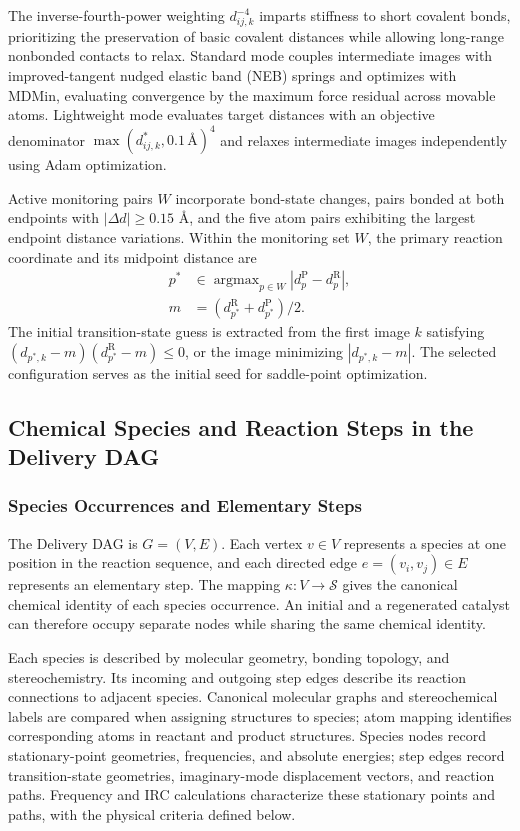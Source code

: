 The inverse-fourth-power weighting $d_{ij,k}^{-4}$ imparts stiffness to short covalent bonds, prioritizing the preservation of basic covalent distances while allowing long-range nonbonded contacts to relax. Standard mode couples intermediate images with improved-tangent nudged elastic band (NEB) springs and optimizes with MDMin, evaluating convergence by the maximum force residual across movable atoms.\citep{neb2000,ase2017} Lightweight mode evaluates target distances with an objective denominator $\max(d_{ij,k}^*,0.1\,\text{Å})^4$ and relaxes intermediate images independently using Adam optimization.\citep{adam2015}

Active monitoring pairs $W$ incorporate bond-state changes, pairs bonded at both endpoints with $|\Delta d|\ge 0.15$ Å, and the five atom pairs exhibiting the largest endpoint distance variations. Within the monitoring set $W$, the primary reaction coordinate and its midpoint distance are
\[
\begin{aligned}
p^*&\in\operatorname{argmax}_{p\in W}|d_p^{\mathrm{P}}-d_p^{\mathrm{R}}|,\\
m&=(d_{p^*}^{\mathrm{R}}+d_{p^*}^{\mathrm{P}})/2.
\end{aligned}
\]
The initial transition-state guess is extracted from the first image $k$ satisfying $(d_{p^*,k}-m)(d_{p^*}^{\mathrm{R}}-m)\le 0$, or the image minimizing $|d_{p^*,k}-m|$. The selected configuration serves as the initial seed for saddle-point optimization.

\subsection{Chemical Species and Reaction Steps in the Delivery DAG}

\subsubsection{Species Occurrences and Elementary Steps}
The Delivery DAG is $G=(V,E)$. Each vertex $v\in V$ represents a species at one position in the reaction sequence, and each directed edge $e=(v_i,v_j)\in E$ represents an elementary step. The mapping $\kappa:V\to\mathcal{S}$ gives the canonical chemical identity of each species occurrence. An initial and a regenerated catalyst can therefore occupy separate nodes while sharing the same chemical identity.

Each species is described by molecular geometry, bonding topology, and stereochemistry. Its incoming and outgoing step edges describe its reaction connections to adjacent species. Canonical molecular graphs and stereochemical labels are compared when assigning structures to species; atom mapping identifies corresponding atoms in reactant and product structures. Species nodes record stationary-point geometries, frequencies, and absolute energies; step edges record transition-state geometries, imaginary-mode displacement vectors, and reaction paths. Frequency and IRC calculations characterize these stationary points and paths, with the physical criteria defined below.

